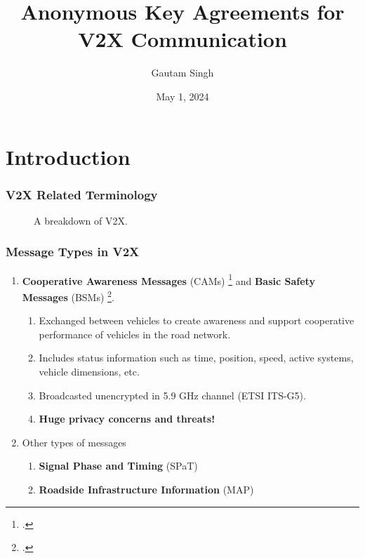 \documentclass{beamer}
\title[AKA for V2X]{Anonymous Key Agreements for V2X Communication}
\date{May 1, 2024}
\author{Gautam Singh}
\institute[IITH]{Indian Institute of Technology Hyderabad}
\begin{document}
    \maketitle
    \tableofcontents
    \section{Introduction}
    
    \begin{frame}
        \frametitle{V2X Related Terminology}
        \begin{figure}
            \centering
            \resizebox{.8\textwidth}{!}{}
            \caption{A breakdown of V2X.}
        \end{figure}
    \end{frame}

    \begin{frame}
        \frametitle{Message Types in V2X}
        \begin{enumerate}
            \item<1-> \textbf{Cooperative Awareness Messages} (CAMs)
            \footcite{etsi-en-302-637} and \textbf{Basic Safety Messages} (BSMs)
            \footcite{J2735_202309V2XCommunications}.
            \begin{enumerate}
                \item Exchanged between vehicles to create awareness and support
                cooperative performance of vehicles in the road network.
                \item Includes status information such as time, position, speed,
                active systems, vehicle dimensions, etc.
                \item Broadcasted unencrypted in 5.9 GHz channel (ETSI ITS-G5).
                \item \textbf{Huge privacy concerns and threats!}
            \end{enumerate}
            \item<2-> Other types of messages
            \begin{enumerate}
                \item \textbf{Signal Phase and Timing} (SPaT)
                \item \textbf{Roadside Infrastructure Information} (MAP)
            \end{enumerate} 
        \end{enumerate}
    \end{frame}
\end{document}
